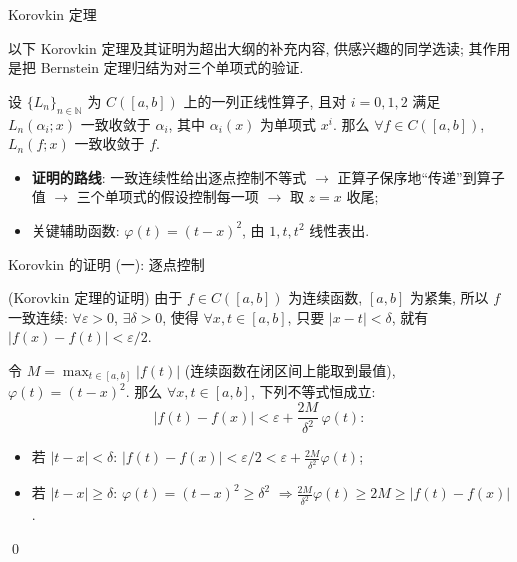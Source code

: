 \begin{frame}{Korovkin 定理}

\begin{attnblock}[超纲补充]
以下 Korovkin 定理及其证明为超出大纲的补充内容, 供感兴趣的同学选读;
其作用是把 Bernstein 定理归结为对三个单项式的验证.
\end{attnblock}

\graymode

\pause

\begin{thm}[Korovkin]
设 $\{ L_n \}_{n \in \mathbb{N}}$ 为 $C([a,b])$ 上的一列正线性算子,
且对 $i = 0, 1, 2$ 满足 $L_n(\alpha_i; x)$ \alert{一致收敛}于 $\alpha_i$,
其中 $\alpha_i(x)$ 为单项式 $x^i$.
那么 $\forall f \in C([a,b])$, $L_n(f; x)$ 一致收敛于 $f$.
\end{thm}

\pause

\begin{itemize}
\item \textbf{证明的路线}: 一致连续性给出逐点控制不等式
  $\to$ 正算子\alert{保序}地``传递''到算子值
  $\to$ 三个单项式的假设控制每一项 $\to$ 取 $z = x$ 收尾;
\item 关键辅助函数: $\varphi(t) = (t - x)^2$, 由 $1, t, t^2$ 线性表出.
\end{itemize}

\normalmode

\end{frame}


\begin{frame}{Korovkin 的证明 (一): 逐点控制}

\graymode

\startproof[bg=yellow, fg=red](Korovkin 定理的证明)
由于 $f \in C([a,b])$ 为连续函数, $[a,b]$ 为紧集, 所以 $f$ 一致连续:
$\forall \varepsilon > 0$, $\exists \delta > 0$, 使得 $\forall x, t \in [a,b]$,
只要 $|x - t| < \delta$, 就有 $|f(x) - f(t)| < \varepsilon / 2$.

\pause
令 $M = \max_{t \in [a,b]} |f(t)|$ (连续函数在闭区间上能取到最值),
$\varphi(t) = (t - x)^2$. 那么 $\forall x, t \in [a,b]$, 下列不等式恒成立:
\[
|f(t) - f(x)| < \varepsilon + \frac{2M}{\delta^2} \, \varphi(t) :
\]
\begin{itemize}
\item 若 $|t - x| < \delta$: $|f(t) - f(x)| < \varepsilon/2
  < \varepsilon + \frac{2M}{\delta^2} \varphi(t)$;
\item 若 $|t - x| \geqslant \delta$: $\varphi(t) = (t-x)^2 \geqslant \delta^2$
  $\Longrightarrow \frac{2M}{\delta^2} \varphi(t) \geqslant 2M
  \geqslant |f(t) - f(x)|$.
\end{itemize}
\qed

\normalmode

\end{frame}

